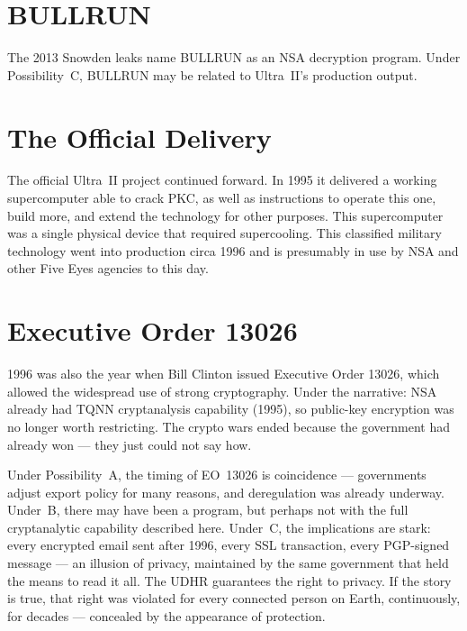 \section*{BULLRUN}
\label{pos17:bullrun-and-eci-subcategories}

The 2013 Snowden leaks name BULLRUN as an NSA decryption program. Under Possibility~C, BULLRUN may be related to Ultra~II's production output.

\section*{The Official Delivery}
\label{pos17:the-official-delivery}

The official Ultra~II project continued forward. In 1995 it delivered a working supercomputer able to crack PKC, as well as instructions to operate this one, build more, and extend the technology for other purposes. This supercomputer was a single physical device that required supercooling. This classified military technology went into production circa 1996 and is presumably in use by NSA and other Five Eyes agencies to this day.

\section*{Executive Order 13026}
\label{pos17:executive-order-13026}

1996 was also the year when Bill Clinton issued Executive Order 13026, which allowed the widespread use of strong cryptography. Under the narrative: NSA already had TQNN cryptanalysis capability (1995), so public-key encryption was no longer worth restricting. The crypto wars ended because the government had already won --- they just could not say how.

Under Possibility~A, the timing of EO~13026 is coincidence --- governments adjust export policy for many reasons, and deregulation was already underway. Under~B, there may have been a program, but perhaps not with the full cryptanalytic capability described here. Under~C, the implications are stark: every encrypted email sent after 1996, every SSL transaction, every PGP-signed message --- an illusion of privacy, maintained by the same government that held the means to read it all. The UDHR guarantees the right to privacy. If the story is true, that right was violated for every connected person on Earth, continuously, for decades --- concealed by the appearance of protection.

\chapterreturn
